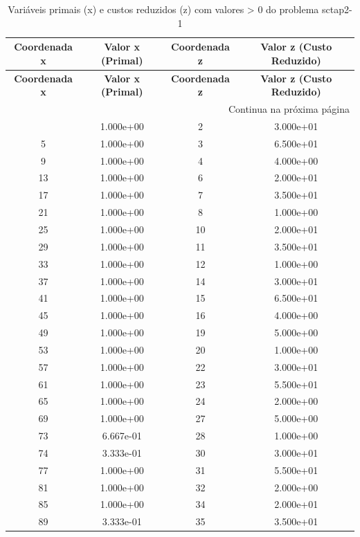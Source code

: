 \documentclass[12pt]{article}
\begin{document}
\begin{longtable}{@{}cccc@{}}
\caption{Variáveis primais (x) e custos reduzidos (z) com valores > 0 do problema sctap2-1} \\
\toprule
\textbf{Coordenada x} & \textbf{Valor x (Primal)} & \textbf{Coordenada z} & \textbf{Valor z (Custo Reduzido)} \\
\midrule
\endfirsthead

\toprule
\textbf{Coordenada x} & \textbf{Valor x (Primal)} & \textbf{Coordenada z} & \textbf{Valor z (Custo Reduzido)} \\
\midrule
\endhead

\midrule \multicolumn{4}{r}{{Continua na próxima página}} \\ \midrule
\endfoot

\bottomrule
\endlastfoot
1 & 1.000e+00 & 2 & 3.000e+01 \\
5 & 1.000e+00 & 3 & 6.500e+01 \\
9 & 1.000e+00 & 4 & 4.000e+00 \\
13 & 1.000e+00 & 6 & 2.000e+01 \\
17 & 1.000e+00 & 7 & 3.500e+01 \\
21 & 1.000e+00 & 8 & 1.000e+00 \\
25 & 1.000e+00 & 10 & 2.000e+01 \\
29 & 1.000e+00 & 11 & 3.500e+01 \\
33 & 1.000e+00 & 12 & 1.000e+00 \\
37 & 1.000e+00 & 14 & 3.000e+01 \\
41 & 1.000e+00 & 15 & 6.500e+01 \\
45 & 1.000e+00 & 16 & 4.000e+00 \\
49 & 1.000e+00 & 19 & 5.000e+00 \\
53 & 1.000e+00 & 20 & 1.000e+00 \\
57 & 1.000e+00 & 22 & 3.000e+01 \\
61 & 1.000e+00 & 23 & 5.500e+01 \\
65 & 1.000e+00 & 24 & 2.000e+00 \\
69 & 1.000e+00 & 27 & 5.000e+00 \\
73 & 6.667e-01 & 28 & 1.000e+00 \\
74 & 3.333e-01 & 30 & 3.000e+01 \\
77 & 1.000e+00 & 31 & 5.500e+01 \\
81 & 1.000e+00 & 32 & 2.000e+00 \\
85 & 1.000e+00 & 34 & 2.000e+01 \\
89 & 3.333e-01 & 35 & 3.500e+01 \\

\end{longtable}
\end{document}
